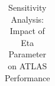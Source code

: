 \begin{table}[!t]
\renewcommand{\arraystretch}{1.2}
\caption{Sensitivity Analysis: Impact of Eta Parameter on ATLAS Performance}
\label{tab:eta_sensitivity}
\centering
\begin{tabular}{l|p{3cm}|cc|c|cc}
\hline\hline
 \\
\hline
\hline\hline
\end{tabular}
\end{table}
